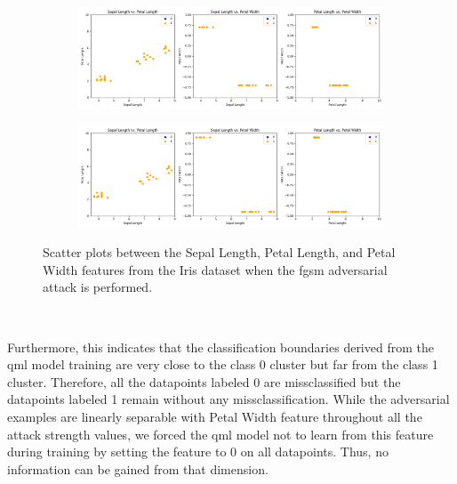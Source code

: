 \begin{figure}[!h]
  \ContinuedFloat
  \centering

  \begin{subfigure}{\textwidth}
      \includegraphics[width=\linewidth]{figures/adversarial_analysis/adversarial-fgsm-0.7.png}
      \label{fig:adv4}
  \end{subfigure}

  \begin{subfigure}{\textwidth}
    \includegraphics[width=\linewidth]{figures/adversarial_analysis/adversarial-fgsm-0.9.png}
    \label{fig:adv5}
  \end{subfigure}

  \caption{Scatter plots between the Sepal Length, Petal Length, and Petal Width features from the Iris dataset when the \ac{fgsm} adversarial attack is performed.}
  \label{fig:adv-fgsm}
\end{figure} \

Furthermore, this indicates that the classification boundaries
derived from the \ac{qml} model training are very close to
the class 0 cluster but far from the class 1 cluster.
Therefore, all the datapoints labeled 0 are missclassified but
the datapoints labeled 1 remain without any missclassification.
While the adversarial examples are linearly separable
with Petal Width feature throughout all the attack strength values,
we forced the \ac{qml} model not to learn from this feature
during training by setting the feature to 0 on all
datapoints. Thus, no information can be gained from that
dimension. \


